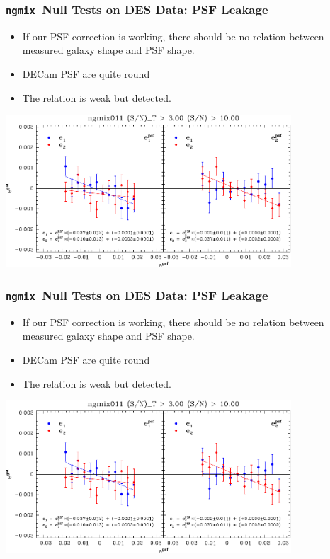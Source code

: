 \documentclass{beamer}
\newcommand{\ngmix}{\texttt{ngmix}}
\begin{document}
\frame
{
    \frametitle{\ngmix\ Null Tests on DES Data: PSF Leakage}

    \begin{itemize}

        \item If our PSF correction is working, there should be no relation between
            measured galaxy shape and PSF shape.

        \item DECam PSF are quite round 

        \item The relation is weak but detected.

    \end{itemize}


    \begin{center}
        \includegraphics[width=0.8\textwidth]{ngmix011-e-vs-epsf-Ts2n-min-300-s2n-min-10.pdf}
    \end{center}

}


\frame
{
    \frametitle{\ngmix\ Null Tests on DES Data: PSF Leakage}

    \begin{itemize}

        \item If our PSF correction is working, there should be no relation between
            measured galaxy shape and PSF shape.

        \item DECam PSF are quite round 

        \item The relation is weak but detected.

    \end{itemize}


    \begin{center}
        \includegraphics[width=0.8\textwidth]{ngmix011-e-vs-epsf-Ts2n-min-300-s2n-min-10.pdf}
    \end{center}

}
\end{document}
